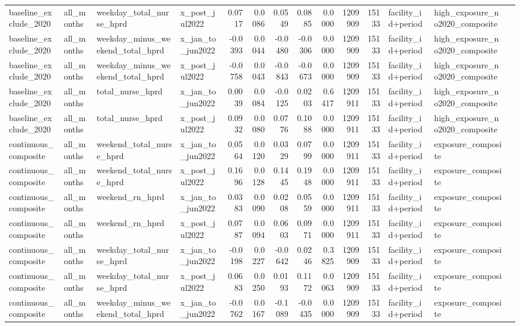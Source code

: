 \begin{tabular}{llllrrrrrrrlll}
baseline_exclude_2020 & all_months & weekday_total_nurse_hprd & x_post_jul2022 & 0.0717 & 0.0086 & 0.0549 & 0.0885 & 0.0000 & 1209909 & 15133 & facility_id+period & high_exposure_no2020_composite &  \\
baseline_exclude_2020 & all_months & weekday_minus_weekend_total_hprd & x_jan_to_jun2022 & -0.0393 & 0.0044 & -0.0480 & -0.0306 & 0.0000 & 1209909 & 15133 & facility_id+period & high_exposure_no2020_composite &  \\
baseline_exclude_2020 & all_months & weekday_minus_weekend_total_hprd & x_post_jul2022 & -0.0758 & 0.0043 & -0.0843 & -0.0673 & 0.0000 & 1209909 & 15133 & facility_id+period & high_exposure_no2020_composite &  \\
baseline_exclude_2020 & all_months & total_nurse_hprd & x_jan_to_jun2022 & 0.0039 & 0.0084 & -0.0125 & 0.0203 & 0.6417 & 1209911 & 15133 & facility_id+period & high_exposure_no2020_composite &  \\
baseline_exclude_2020 & all_months & total_nurse_hprd & x_post_jul2022 & 0.0932 & 0.0080 & 0.0776 & 0.1088 & 0.0000 & 1209911 & 15133 & facility_id+period & high_exposure_no2020_composite &  \\
continuous_composite & all_months & weekend_total_nurse_hprd & x_jan_to_jun2022 & 0.0564 & 0.0120 & 0.0329 & 0.0799 & 0.0000 & 1209911 & 15133 & facility_id+period & exposure_composite &  \\
continuous_composite & all_months & weekend_total_nurse_hprd & x_post_jul2022 & 0.1696 & 0.0128 & 0.1445 & 0.1948 & 0.0000 & 1209911 & 15133 & facility_id+period & exposure_composite &  \\
continuous_composite & all_months & weekend_rn_hprd & x_jan_to_jun2022 & 0.0383 & 0.0090 & 0.0208 & 0.0559 & 0.0000 & 1209911 & 15133 & facility_id+period & exposure_composite &  \\
continuous_composite & all_months & weekend_rn_hprd & x_post_jul2022 & 0.0787 & 0.0094 & 0.0603 & 0.0971 & 0.0000 & 1209911 & 15133 & facility_id+period & exposure_composite &  \\
continuous_composite & all_months & weekday_total_nurse_hprd & x_jan_to_jun2022 & -0.0198 & 0.0227 & -0.0642 & 0.0246 & 0.3825 & 1209909 & 15133 & facility_id+period & exposure_composite &  \\
continuous_composite & all_months & weekday_total_nurse_hprd & x_post_jul2022 & 0.0683 & 0.0250 & 0.0193 & 0.1172 & 0.0063 & 1209909 & 15133 & facility_id+period & exposure_composite &  \\
continuous_composite & all_months & weekday_minus_weekend_total_hprd & x_jan_to_jun2022 & -0.0762 & 0.0167 & -0.1089 & -0.0435 & 0.0000 & 1209909 & 15133 & facility_id+period & exposure_composite &  \\

\end{tabular}
